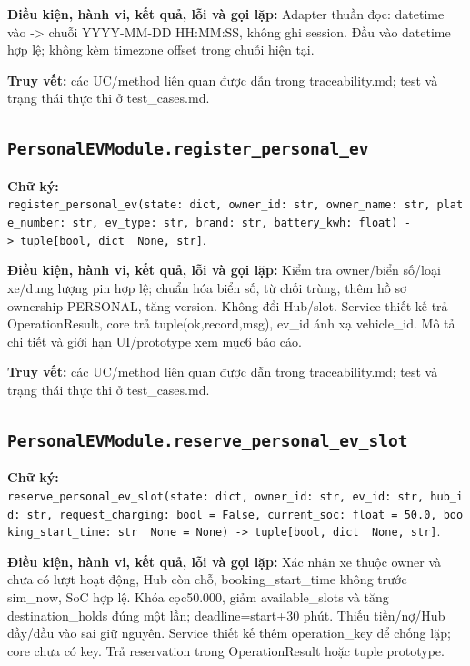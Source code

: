 \documentclass[11pt,a4paper]{article}
\begin{document}
\textbf{Điều kiện, hành vi, kết quả, lỗi và gọi lặp:} Adapter thuần đọc:
datetime vào -\textgreater{} chuỗi YYYY-MM-DD HH:MM:SS, không ghi
session. Đầu vào datetime hợp lệ; không kèm timezone offset trong chuỗi
hiện tại.

\textbf{Truy vết:} các UC/method liên quan được dẫn trong
traceability.md; test và trạng thái thực thi ở test\_cases.md.

\hypertarget{personalevmodule.register_personal_ev}{%
\subsection{\texorpdfstring{\texttt{PersonalEVModule.register\_personal\_ev}}{PersonalEVModule.register\_personal\_ev}}\label{personalevmodule.register_personal_ev}}

\textbf{Chữ ký:}
\texttt{register\_personal\_ev(state:\ dict,\ owner\_id:\ str,\ owner\_name:\ str,\ plate\_number:\ str,\ ev\_type:\ str,\ brand:\ str,\ battery\_kwh:\ float)\ -\textgreater{}\ tuple{[}bool,\ dict\ \textbar{}\ None,\ str{]}}.

\textbf{Điều kiện, hành vi, kết quả, lỗi và gọi lặp:} Kiểm tra
owner/biển số/loại xe/dung lượng pin hợp lệ; chuẩn hóa biển số, từ chối
trùng, thêm hồ sơ ownership PERSONAL, tăng version. Không đổi Hub/slot.
Service thiết kế trả OperationResult, core trả tuple(ok,record,msg),
ev\_id ánh xạ vehicle\_id. Mô tả chi tiết và giới hạn UI/prototype xem
mục6 báo cáo.

\textbf{Truy vết:} các UC/method liên quan được dẫn trong
traceability.md; test và trạng thái thực thi ở test\_cases.md.

\hypertarget{personalevmodule.reserve_personal_ev_slot}{%
\subsection{\texorpdfstring{\texttt{PersonalEVModule.reserve\_personal\_ev\_slot}}{PersonalEVModule.reserve\_personal\_ev\_slot}}\label{personalevmodule.reserve_personal_ev_slot}}

\textbf{Chữ ký:}
\texttt{reserve\_personal\_ev\_slot(state:\ dict,\ owner\_id:\ str,\ ev\_id:\ str,\ hub\_id:\ str,\ request\_charging:\ bool\ =\ False,\ current\_soc:\ float\ =\ 50.0,\ booking\_start\_time:\ str\ \textbar{}\ None\ =\ None)\ -\textgreater{}\ tuple{[}bool,\ dict\ \textbar{}\ None,\ str{]}}.

\textbf{Điều kiện, hành vi, kết quả, lỗi và gọi lặp:} Xác nhận xe thuộc
owner và chưa có lượt hoạt động, Hub còn chỗ, booking\_start\_time không
trước sim\_now, SoC hợp lệ. Khóa cọc50.000, giảm available\_slots và
tăng destination\_holds đúng một lần; deadline=start+30 phút. Thiếu
tiền/nợ/Hub đầy/đầu vào sai giữ nguyên. Service thiết kế thêm
operation\_key để chống lặp; core chưa có key. Trả reservation trong
OperationResult hoặc tuple prototype.
\end{document}
